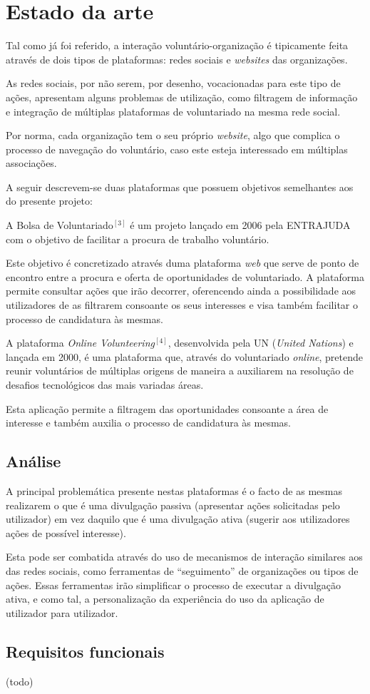 \section{Estado da arte}
Tal como já foi referido, a interação voluntário-organização é tipicamente feita através de dois tipos de plataformas: redes sociais e \textit{websites} das organizações. \par \bigskip
As redes sociais, por não serem, por desenho, vocacionadas para este tipo de ações, apresentam alguns problemas de utilização, como filtragem de informação e integração de múltiplas plataformas de voluntariado na mesma rede social. \par \bigskip
Por norma, cada organização tem o seu próprio \textit{website}, algo que complica o processo de navegação do voluntário, caso este esteja interessado em múltiplas associações. \par \bigskip
A seguir descrevem-se duas plataformas que possuem objetivos semelhantes aos do presente projeto: \par \bigskip

A Bolsa de Voluntariado$^{[3]}$ é um projeto lançado em 2006 pela ENTRAJUDA com o objetivo de facilitar a procura de trabalho voluntário.  \par \medskip
Este objetivo é concretizado através duma plataforma \textit{web} que serve de ponto de encontro entre a procura e oferta de oportunidades de voluntariado. A plataforma permite consultar ações que irão decorrer, oferencendo ainda a possibilidade aos utilizadores de as filtrarem consoante os seus interesses e visa também facilitar o processo de candidatura às mesmas. \par \bigskip

A plataforma \textit{Online Volunteering}$^{[4]}$, desenvolvida pela UN (\textit{United Nations}) e lançada em 2000, é uma plataforma que, através do voluntariado \textit{online}, pretende reunir voluntários de múltiplas origens de maneira a auxiliarem na resolução de desafios tecnológicos das mais variadas áreas.  \par \medskip
Esta aplicação permite a filtragem das oportunidades consoante a área de interesse e também auxilia o processo de candidatura às mesmas. \bigskip

\subsection{Análise}
A principal problemática presente nestas plataformas é o facto de as mesmas realizarem o que é uma divulgação passiva (apresentar ações solicitadas pelo utilizador) em vez daquilo que é uma divulgação ativa (sugerir aos utilizadores ações de possível interesse). \par \bigskip
Esta pode ser combatida através do uso de mecanismos de interação similares aos das redes sociais, como ferramentas de “seguimento” de organizações ou tipos de ações. Essas ferramentas irão simplificar o processo de executar a divulgação ativa, e como tal, a personalização da experiência do uso da aplicação de utilizador para utilizador.

\subsection{Requisitos funcionais}

(todo)